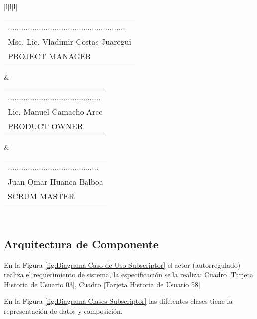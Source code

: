 \begin{minipage}[b]{\hsize}
\begin{tabular}{|l|l|l|}
 \\ \hline
\begin{tabular}[c]{@{}l@{}}.....................................................\\ Msc. Lic. Vladimir Costas Juaregui\\ PROJECT MANAGER\end{tabular} & \begin{tabular}[c]{@{}l@{}}..........................................\\ Lic. Manuel Camacho Arce\\ PRODUCT OWNER\end{tabular} & \begin{tabular}[c]{@{}l@{}}.........................................\\ Juan Omar Huanca Balboa\\ SCRUM MASTER\end{tabular} \\ \hline
\end{tabular}
\label{Tarjeta Historia de Usuario 58}
\end{minipage}

\subsection{Arquitectura de Componente}

En la Figura \ref{fig:Diagrama Caso de Uso Subscriptor} el actor
(autorregulado) realiza el requerimiento de sistema, la especificación
se la realiza: Cuadro \ref{Tarjeta Historia de Usuario 03}, Cuadro 
\ref{Tarjeta Historia de Usuario 58}

\begin{minipage}{1.0\textwidth}
	\centering
	\label{fig:Diagrama Caso de Uso Subscriptor}
\end{minipage}

En la Figura \ref{fig:Diagrama Clases Subscriptor} las diferentes clases
tiene la representación de datos y composición.

